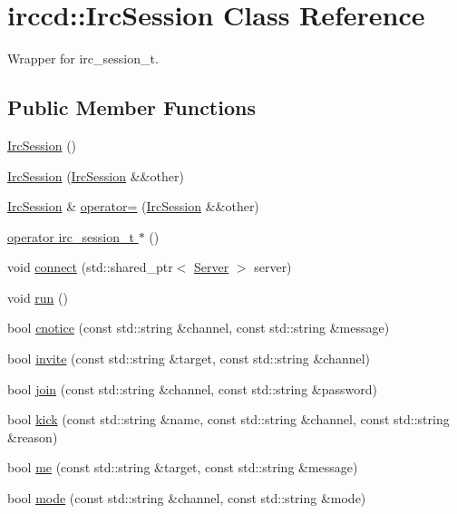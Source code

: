 \hypertarget{a00035}{\section{irccd\-:\-:Irc\-Session Class Reference}
\label{a00035}
}


Wrapper for irc\-\_\-session\-\_\-t.  


\subsection*{Public Member Functions}
\begin{DoxyCompactItemize}
\item 
\hyperlink{a00035_a091c5cdd4db9675fee4a2bd29d24ffa6}{Irc\-Session} ()
\item 
\hyperlink{a00035_a317ab674eb328274b62d85cfbb022731}{Irc\-Session} (\hyperlink{a00035}{Irc\-Session} \&\&other)
\item 
\hyperlink{a00035}{Irc\-Session} \& \hyperlink{a00035_a7be54cea5e7e81baa3b2dafb79c7def6}{operator=} (\hyperlink{a00035}{Irc\-Session} \&\&other)
\item 
\hyperlink{a00035_a5bc9dd45ad95c0f2c58e9185f1ce4866}{operator irc\-\_\-session\-\_\-t $\ast$} ()
\item 
void \hyperlink{a00035_a9310da1118951722479b5b597eba615e}{connect} (std\-::shared\-\_\-ptr$<$ \hyperlink{a00055}{Server} $>$ server)
\item 
void \hyperlink{a00035_a4d017edb9f4735749e9c31f6e4970714}{run} ()
\item 
bool \hyperlink{a00035_ac8090aca0f8639e7d66d727a969c7ba9}{cnotice} (const std\-::string \&channel, const std\-::string \&message)
\item 
bool \hyperlink{a00035_a3942b5c7881122e2bfce098f6713319c}{invite} (const std\-::string \&target, const std\-::string \&channel)
\item 
bool \hyperlink{a00035_a51877d3f510cd2829c269e35195c96fe}{join} (const std\-::string \&channel, const std\-::string \&password)
\item 
bool \hyperlink{a00035_a6f9183f39ed15cd97fc3659e25c42709}{kick} (const std\-::string \&name, const std\-::string \&channel, const std\-::string \&reason)
\item 
bool \hyperlink{a00035_a5e40105dde1a33aca57c59b04b482078}{me} (const std\-::string \&target, const std\-::string \&message)
\item 
bool \hyperlink{a00035_a279db04d81937d22ec68f2e804ab7d24}{mode} (const std\-::string \&channel, const std\-::string \&mode)

\end{DoxyCompactItemize}
